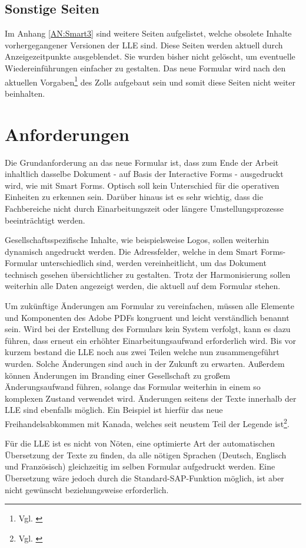 	
	\subsection{Sonstige Seiten}
	
	Im Anhang \ref{AN:Smart3} sind weitere Seiten aufgelistet, welche obsolete Inhalte vorhergegangener Versionen der \ac{LLE} sind. Diese Seiten werden aktuell durch Anzeigezeitpunkte ausgeblendet. Sie wurden bisher nicht gelöscht, um eventuelle Wiedereinführungen einfacher zu gestalten.
	Das neue Formular wird nach den aktuellen Vorgaben\footnote{Vgl. \cite{ZOLL.2017}} des Zolls aufgebaut sein und somit diese Seiten nicht weiter beinhalten.
	
	
	\FloatBarrier
	\section{Anforderungen}
	\label{ch:Anf}
		Die Grundanforderung an das neue Formular ist, dass zum Ende der Arbeit inhaltlich dasselbe Dokument - auf Basis der Interactive Forms - ausgedruckt wird, wie mit Smart Forms. Optisch soll kein Unterschied für die operativen Einheiten zu erkennen sein. Darüber hinaus ist es sehr wichtig, dass die Fachbereiche nicht durch Einarbeitungszeit oder längere Umstellungsprozesse beeinträchtigt werden. 
	
		Gesellschaftsspezifische Inhalte, wie beispielsweise Logos, sollen weiterhin dynamisch angedruckt werden.
		Die Adressfelder, welche in dem Smart Forms-Formular unterschiedlich sind, werden vereinheitlicht, um das Dokument technisch gesehen übersichtlicher zu gestalten. Trotz der Harmonisierung sollen weiterhin alle Daten angezeigt werden, die aktuell auf dem Formular stehen. 
		
		Um zukünftige Änderungen am Formular zu vereinfachen, müssen alle Elemente und Komponenten des Adobe \ac{PDF}s kongruent und leicht verständlich benannt sein. Wird bei der Erstellung des Formulars kein System verfolgt, kann es dazu führen, dass erneut ein erhöhter Einarbeitungsaufwand erforderlich wird. Bis vor kurzem bestand die \ac{LLE} noch aus zwei Teilen welche nun zusammengeführt wurden. Solche Änderungen sind auch in der Zukunft zu erwarten. Außerdem können Änderungen im Branding einer Gesellschaft zu großem Änderungsaufwand führen, solange das Formular weiterhin in einem so komplexen Zustand verwendet wird. Änderungen seitens der Texte innerhalb der \ac{LLE} sind ebenfalls möglich. Ein Beispiel ist hierfür das neue Freihandelsabkommen mit Kanada, welches seit neustem Teil der Legende ist\footnote{Vgl. \cite{ZOLL.2017b}}.
		
		Für die \ac{LLE} ist es nicht von Nöten, eine optimierte Art der automatischen Übersetzung der Texte zu finden, da alle nötigen Sprachen (Deutsch, Englisch und Französisch) gleichzeitig im selben Formular aufgedruckt werden. Eine Übersetzung wäre jedoch durch die Standard-SAP-Funktion möglich, ist aber nicht gewünscht beziehungsweise erforderlich.
		
